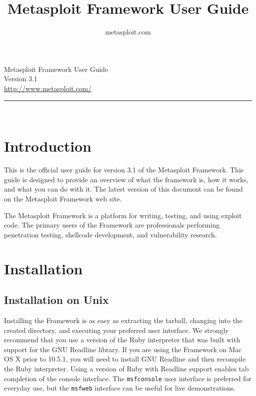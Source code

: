 \documentclass{report}
\begin{document}
\title{Metasploit Framework User Guide}
\author{metasploit.com}

\begin{titlepage}
    \begin{center}
        		
        \huge{Metasploit Framework User Guide}
		\ \\[10mm]
		\large{Version 3.1}
		\\[120mm]
		
        \small{\url{http://www.metasploit.com/}}

        \rule{10cm}{1pt} \\[4mm]
        \renewcommand{\arraystretch}{0.5}
    \end{center}
\end{titlepage}

\tableofcontents

\setlength{\parindent}{0pt} \setlength{\parskip}{8pt}


\chapter{Introduction}

\par
This is the official user guide for version 3.1 of the Metasploit Framework. This 
guide is designed to provide an overview of what the framework is, how it works,
and what you can do with it. The latest version of this document can be found
on the Metasploit Framework web site. 

\par
The Metasploit Framework is a platform for writing, testing, and using exploit code.
The primary users of the Framework are professionals performing penetration testing,
shellcode development, and vulnerability research.

\par
\pagebreak

\chapter{Installation}

    \section{Installation on Unix}
    \label{INSTALL-UNIX}
\par
Installing the Framework is as easy as extracting the tarball, changing into the
created directory, and executing your preferred user interface. We strongly
recommend that you use a version of the Ruby interpreter that was built with
support for the GNU Readline library. If you are using the Framework on Mac OS
X prior to 10.5.1, you will need to install GNU Readline and then recompile the Ruby
interpreter.  Using a version of Ruby with Readline support enables tab completion
of the console interface.  The \texttt{msfconsole} user interface is preferred for everyday
use, but the \texttt{msfweb} interface can be useful for live demonstrations.
\end{document}
